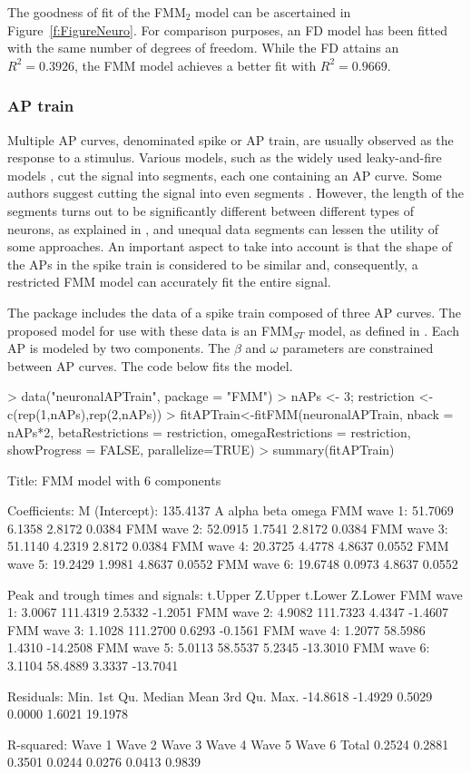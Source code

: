 The goodness of fit of the FMM$_2$ model can be ascertained in Figure~\ref{f:FigureNeuro}. For comparison purposes, an FD model has been fitted with the same number of degrees of freedom. While the FD attains an $R^2 = 0.3926$, the FMM model achieves a better fit with $R^2 = 0.9669$.

\subsubsection{AP train}\label{subsubsec:APtrain}
Multiple AP curves, denominated spike or AP train, are usually observed as the response to a stimulus. Various models, such as the widely used leaky-and-fire models \citep{Lynch+Houghton:2015}, cut the signal into segments, each one containing an AP curve. Some authors suggest cutting the signal into even segments \citep{Gerstner+Kistler+Naud+Paninski:2014}. However, the length of the segments turns out to be significantly different between different types of neurons, as explained in \cite{Teeter+Iyer+Menon+al:2018}, and unequal data segments can lessen the utility of some approaches. An important aspect to take into account is that the shape of the APs in the spike train is considered to be similar and, consequently, a restricted FMM model can accurately fit the entire signal.

The  package includes the data of a spike train composed of three AP curves. The proposed model for use with these data is an FMM$_{ST}$ model, as defined in \cite{RodriguezCollado+Rueda:2021}. Each AP is modeled by two components. The $\beta$ and $\omega$ parameters are constrained between AP curves. The code below fits the model. 
%
\begin{example}
> data("neuronalAPTrain", package = "FMM")
> nAPs <- 3; restriction <- c(rep(1,nAPs),rep(2,nAPs))
> fitAPTrain<-fitFMM(neuronalAPTrain, nback = nAPs*2, 
                      betaRestrictions = restriction, 
                      omegaRestrictions = restriction, 
                      showProgress = FALSE, parallelize=TRUE)
> summary(fitAPTrain)

Title:
FMM model with 6 components

Coefficients:
M (Intercept): 135.4137
                   A  alpha   beta  omega
FMM wave 1:  51.7069 6.1358 2.8172 0.0384
FMM wave 2:  52.0915 1.7541 2.8172 0.0384
FMM wave 3:  51.1140 4.2319 2.8172 0.0384
FMM wave 4:  20.3725 4.4778 4.8637 0.0552
FMM wave 5:  19.2429 1.9981 4.8637 0.0552
FMM wave 6:  19.6748 0.0973 4.8637 0.0552

Peak and trough times and signals:
             t.Upper  Z.Upper t.Lower  Z.Lower
FMM wave 1:   3.0067 111.4319  2.5332  -1.2051
FMM wave 2:   4.9082 111.7323  4.4347  -1.4607
FMM wave 3:   1.1028 111.2700  0.6293  -0.1561
FMM wave 4:   1.2077  58.5986  1.4310 -14.2508
FMM wave 5:   5.0113  58.5537  5.2345 -13.3010
FMM wave 6:   3.1104  58.4889  3.3337 -13.7041

Residuals:
    Min.  1st Qu.   Median     Mean  3rd Qu.     Max. 
-14.8618  -1.4929   0.5029   0.0000   1.6021  19.1978 

R-squared:
Wave 1 Wave 2 Wave 3 Wave 4 Wave 5 Wave 6  Total 
0.2524 0.2881 0.3501 0.0244 0.0276 0.0413 0.9839 
\end{example}
%

